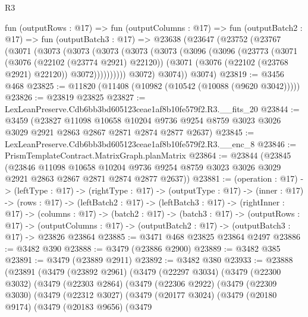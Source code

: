 \begin{lexlean}{R3}
\begin{coremodule}
  fun (outputRows : @17) =>
  fun (outputColumns : @17) =>
  fun (outputBatch2 : @17) =>
  fun (outputBatch3 : @17) =>
  @23638
    (@23647
      (@23752
        (@23767
          (@3071
            (@3073
              (@3073
                (@3073
                  (@3073
                    (@3073
                      (@3096
                        (@3096
                          (@23773
                            (@3071
                              (@3076 (@22102 (@23774 @2921) @22120))
                              (@3071 (@3076 (@22102 (@23768 @2921) @22120)) @3072))))))))))
            @3072)
          @3074))
      @3074)
@23819 := @3456 @468
@23825 := @11820 (@11408 (@10982 (@10542 (@10088 (@9620 @3042)))))
@23826 := @23819 @23825
@23827 := LexLeanPreserve.Cdb6bb3bd605123ceae1af8b10fe579f2.R3.__fits_20
@23844 := @3459
    (@23827
      @11098
      @10658
      @10204
      @9736
      @9254
      @8759
      @3023
      @3026
      @3029
      @2921
      @2863
      @2867
      @2871
      @2874
      @2877
      @2637)
@23845 := LexLeanPreserve.Cdb6bb3bd605123ceae1af8b10fe579f2.R3.__enc_8
@23846 := PrismTemplateContract.MatrixGraph.planMatrix
@23864 := @23844
    (@23845
      (@23846
        @11098
        @10658
        @10204
        @9736
        @9254
        @8759
        @3023
        @3026
        @3029
        @2921
        @2863
        @2867
        @2871
        @2874
        @2877
        @2637))
@23881 := (operation : @17) ->
  (leftType : @17) ->
  (rightType : @17) ->
  (outputType : @17) ->
  (inner : @17) ->
  (rows : @17) ->
  (leftBatch2 : @17) ->
  (leftBatch3 : @17) ->
  (rightInner : @17) ->
  (columns : @17) ->
  (batch2 : @17) ->
  (batch3 : @17) ->
  (outputRows : @17) ->
  (outputColumns : @17) -> (outputBatch2 : @17) -> (outputBatch3 : @17) -> @23826 @23864
@23885 := @3471 @468 @23825 @23864 @2497
@23886 := @3482 @390
@23888 := @3479 (@23886 @2900)
@23889 := @3482 @385
@23891 := @3479 (@23889 @2911)
@23892 := @3482 @380
@23933 := @23888
    (@23891
      (@3479
        (@23892 @2961)
        (@3479
          (@22297 @3034)
          (@3479
            (@22300 @3032)
            (@3479
              (@22303 @2864)
              (@3479
                (@22306 @2922)
                (@3479
                  (@22309 @3030)
                  (@3479
                    (@22312 @3027)
                    (@3479
                      (@20177 @3024)
                      (@3479
                        (@20180 @9174)
                        (@3479
                          (@20183 @9656)
                          (@3479

\end{coremodule}
\end{lexlean}
